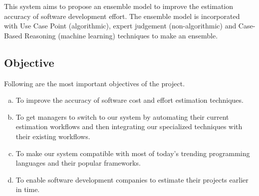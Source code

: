 This system aims to propose an ensemble model to improve the estimation accuracy of software development effort. The ensemble model is incorporated with Use Case Point (algorithmic), expert judgement (non-algorithmic) and Case-Based Reasoning (machine learning) techniques to make an ensemble.









\subsection{Objective}
Following are the most important objectives of the project.
\begin{enumerate}[(a)]
	\item To improve the accuracy of software cost and effort estimation techniques.
	\item To get managers to switch to our system by automating their current estimation workflows and then  integrating our specialized techniques with their existing workflows.
	\item To make our system compatible with most of today's trending programming languages and their popular frameworks.
	\item To enable software development companies to estimate their projects earlier in time.
\end{enumerate}













